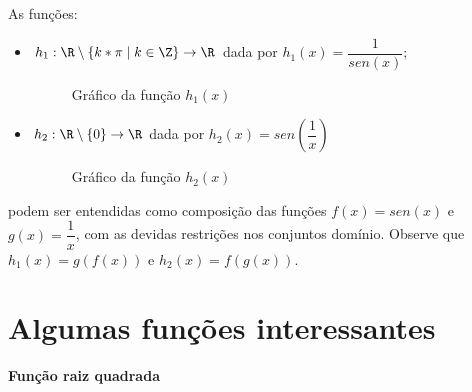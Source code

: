 \begin{exem}
As funções:
\begin{itemize}
\item $h_1: \R \setminus \{k*\pi \mid k \in \Z\} \to \R$ dada por $h_1(x)= \dfrac{1}{sen(x)}$;
  \begin{figure}[H]
 \centering
    \caption{Gráfico da função $h_1(x)$}
  \end{figure}
\item $h_2: \R \setminus \{0\} \to \R$ dada por $h_2(x)= sen \left(\dfrac{1}{x} \right)$
  \begin{figure}[H]
 \centering
    \caption{Gráfico da função $h_2(x)$}
  \end{figure}
\end{itemize}
podem ser entendidas como composição das funções $f(x)= sen(x)$ e $g(x)= \dfrac{1}{x}$, com as devidas restrições nos conjuntos domínio. Observe que $h_1(x)= g(f(x))$ e $h_2(x)= f(g(x))$.
\end{exem}



\section{Algumas funções interessantes}

  \textbf{Função raiz quadrada}


